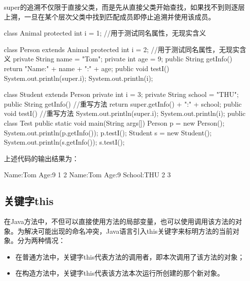 super的追溯不仅限于直接父类，而是先从直接父类开始查找，如果找不到则逐层
上溯，一旦在某个层次父类中找到匹配成员即停止追溯并使用该成员。


\begin{javaCode}
  class Animal {
    protected int i = 1;   //用于测试同名属性，无现实含义
  }

  class Person extends Animal {
    protected int i = 2;     //用于测试同名属性，无现实含义
    private String name = "Tom";
    private int age = 9;
    public String getInfo() {
      return "Name:" + name + "\tAge:" + age;
    }
    public void testI() {
      System.out.println(super.i);
      System.out.println(i);
    }
  }
\end{javaCode}


\begin{javaCode}
  class Student extends Person {
    private int i = 3;
    private String school = "THU";
    public String getInfo() {       //重写方法
      return super.getInfo() + "\tSchool:" + school;
    }
    public void testI() {       //重写方法
      System.out.println(super.i);
      System.out.println(i);
    }
  }
  public class Test {
    public static void main(String args[]) {
      Person p = new Person();
      System.out.println(p.getInfo());
      p.testI();
      Student s = new Student();
      System.out.println(s.getInfo());
      s.testI();
    }
  }
\end{javaCode}

上述代码的输出结果为：

\begin{stdoutCode}
  Name:Tom Age:9
  1
  2
  Name:Tom Age:9 School:THU
  2
  3  
\end{stdoutCode}

\subsection{关键字this}

在Java方法中，不但可以直接使用方法的局部变量，也可以使用调用该方法的对
象。为解决可能出现的命名冲突，Java语言引入this关键字来标明方法的当前对
象。分为两种情况：

\begin{itemize}
\item 在普通方法中，关键字this代表方法的调用者，即本次调用了该方法的对象；
\item 在构造方法中，关键字this代表该方法本次运行所创建的那个新对象。
\end{itemize}

